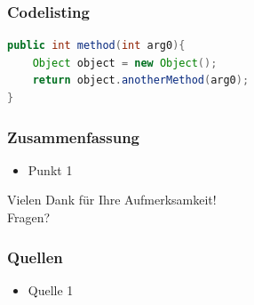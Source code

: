\documentclass[xcolor=dvipsnames]{beamer}
\begin{document}
\begin{frame}[fragile]\frametitle{Codelisting}
\begin{lstlisting}[language=Java]
public int method(int arg0){
    Object object = new Object();
    return object.anotherMethod(arg0);
}
\end{lstlisting}
\end{frame}

\begin{frame}\frametitle{Zusammenfassung}
	\begin{itemize}
		\item Punkt 1
	\end{itemize}
\end{frame}

\begin{frame}
	\centering
	\textcolor{htwgreen}{{\LARGE Vielen Dank für Ihre Aufmerksamkeit!\\[6ex] Fragen?}}
\end{frame}

\begin{frame}\frametitle{Quellen}
		\begin{itemize}
		\item Quelle 1
	\end{itemize}
\end{frame}
\end{document}
